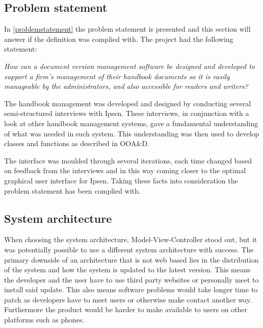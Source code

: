 


\subsection{Problem statement}
In \cref{problemstatement} the problem statement is presented and this section will answer if the definition was complied with. The project had the following statement:

\begin{center}
\textit{How can a document version management software be designed and developed to support a firm's management of their handbook documents so it is easily manageable by the administrators, and also accessible for readers and writers?}
\end{center}

The handbook management was developed and designed by conducting several semi-structured interviews with Ipsen. These interviews, in conjunction with a look at other handbook management systems, gave a fundamental understanding of what was needed in such system. This understanding was then used to develop classes and functions as described in OOA\&D\cite{Rod-Aalborg}. 

The interface was moulded through several iterations, each time changed based on feedback from the interviews and in this way coming closer to the optimal graphical user interface for Ipsen. Taking these facts into consideration the problem statement has been complied with.

\subsection{System architecture}
When choosing the system architecture, Model-View-Controller stood out, but it was potentially possible to use a different system architecture with success. The primary downside of an architecture that is not web based lies in the distribution of the system and how the system is updated to the latest version. This means the developer and the user have to use third party websites or personally meet to install said update. This also means software problems would take longer time to patch as developers have to meet users or otherwise make contact another way. Furthermore the product would be harder to make available to users on other platforms such as phones.

